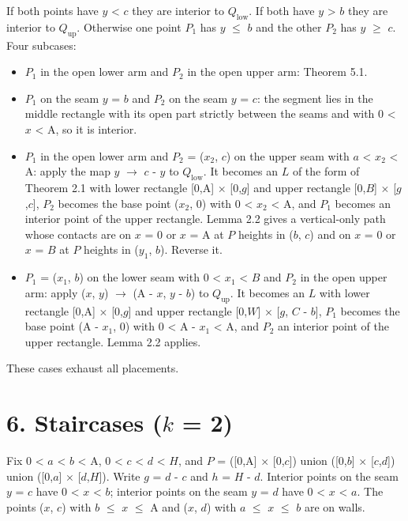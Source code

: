 \documentclass[11pt]{article}
\begin{document}
If both points have \(y\) < \(c\) they are interior to \(Q_{\mathrm{low}}\). If both have \(y\) > \(b\) they are interior to \(Q_{\mathrm{up}}\). Otherwise one point \(P_{1}\) has \(y\) \(\le\) \(b\) and the other \(P_{2}\) has \(y\) \(\ge\) \(c\). Four subcases:

\begin{itemize}
\item \(P_{1}\) in the open lower arm and \(P_{2}\) in the open upper arm: Theorem 5.1.
\item \(P_{1}\) on the seam \(y\) = \(b\) and \(P_{2}\) on the seam \(y\) = \(c\): the segment lies in the middle rectangle with its open part strictly between the seams and with 0 < \(x\) < A, so it is interior.
\item \(P_{1}\) in the open lower arm and \(P_{2}\) = (\(x_{2}\), \(c\)) on the upper seam with \(a\) < \(x_{2}\) < A: apply the map \(y\) \(\to\) \(c\) - \(y\) to \(Q_{\mathrm{low}}\). It becomes an \(L\) of the form of Theorem 2.1 with lower rectangle [0,A] \(\times\) [0,\(g\)] and upper rectangle [0,\(B\)] \(\times\) [\(g\),\(c\)], \(P_{2}\) becomes the base point (\(x_{2}\), 0) with 0 < \(x_{2}\) < A, and \(P_{1}\) becomes an interior point of the upper rectangle. Lemma 2.2 gives a vertical-only path whose contacts are on \(x\) = 0 or \(x\) = A at \(P\) heights in (\(b\), \(c\)) and on \(x\) = 0 or \(x\) = \(B\) at \(P\) heights in (\(y_{1}\), \(b\)). Reverse it.
\item \(P_{1}\) = (\(x_{1}\), \(b\)) on the lower seam with 0 < \(x_{1}\) < \(B\) and \(P_{2}\) in the open upper arm: apply (\(x\), \(y\)) \(\to\) (A - \(x\), \(y\) - \(b\)) to \(Q_{\mathrm{up}}\). It becomes an \(L\) with lower rectangle [0,A] \(\times\) [0,\(g\)] and upper rectangle [0,\(W\)] \(\times\) [\(g\), \(C\) - \(b\)], \(P_{1}\) becomes the base point (A - \(x_{1}\), 0) with 0 < A - \(x_{1}\) < A, and \(P_{2}\) an interior point of the upper rectangle. Lemma 2.2 applies.
\end{itemize}
These cases exhaust all placements.

\section*{6. Staircases (\(k\) = 2)}
Fix 0 < \(a\) < \(b\) < A, 0 < \(c\) < \(d\) < \(H\), and \(P\) = ([0,A] \(\times\) [0,\(c\)]) union ([0,\(b\)] \(\times\) [\(c\),\(d\)]) union ([0,\(a\)] \(\times\) [\(d\),\(H\)]). Write \(g\) = \(d\) - \(c\) and \(h\) = \(H\) - \(d\). Interior points on the seam \(y\) = \(c\) have 0 < \(x\) < \(b\); interior points on the seam \(y\) = \(d\) have 0 < \(x\) < \(a\). The points (\(x\), \(c\)) with \(b\) \(\le\) \(x\) \(\le\) A and (\(x\), \(d\)) with \(a\) \(\le\) \(x\) \(\le\) \(b\) are on walls.
\end{document}
